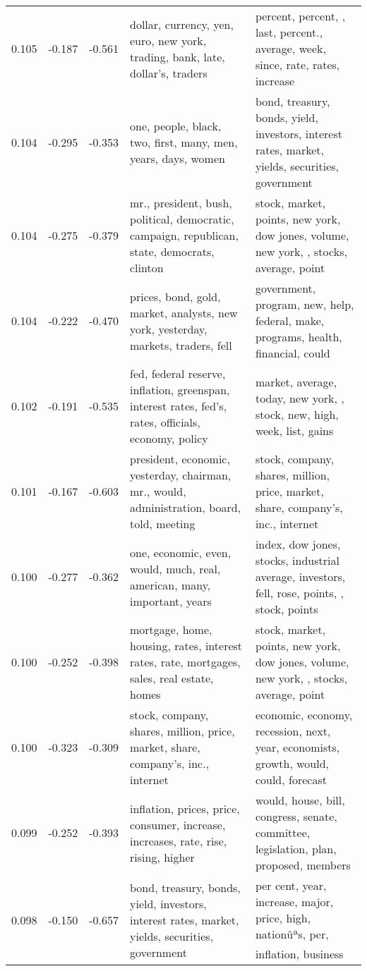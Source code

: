 \begin{tabular}{cccp{5cm}p{5cm}}
0.105 & -0.187 & -0.561 & dollar, currency, yen, euro, new york, trading, bank, late, dollar's, traders & percent, percent, , last, percent., average, week, since, rate, rates, increase \\
0.104 & -0.295 & -0.353 & one, people, black, two, first, many, men, years, days, women & bond, treasury, bonds, yield, investors, interest rates, market, yields, securities, government \\
0.104 & -0.275 & -0.379 & mr., president, bush, political, democratic, campaign, republican, state, democrats, clinton & stock, market, points, new york, dow jones, volume, new york, , stocks, average, point \\
0.104 & -0.222 & -0.470 & prices, bond, gold, market, analysts, new york, yesterday, markets, traders, fell & government, program, new, help, federal, make, programs, health, financial, could \\
0.102 & -0.191 & -0.535 & fed, federal reserve, inflation, greenspan, interest rates, fed's, rates, officials, economy, policy & market, average, today, new york, , stock, new, high, week, list, gains \\
0.101 & -0.167 & -0.603 & president, economic, yesterday, chairman, mr., would, administration, board, told, meeting & stock, company, shares, million, price, market, share, company's, inc., internet \\
0.100 & -0.277 & -0.362 & one, economic, even, would, much, real, american, many, important, years & index, dow jones, stocks, industrial average, investors, fell, rose, points, , stock, points \\
0.100 & -0.252 & -0.398 & mortgage, home, housing, rates, interest rates, rate, mortgages, sales, real estate, homes & stock, market, points, new york, dow jones, volume, new york, , stocks, average, point \\
0.100 & -0.323 & -0.309 & stock, company, shares, million, price, market, share, company's, inc., internet & economic, economy, recession, next, year, economists, growth, would, could, forecast \\
0.099 & -0.252 & -0.393 & inflation, prices, price, consumer, increase, increases, rate, rise, rising, higher & would, house, bill, congress, senate, committee, legislation, plan, proposed, members \\
0.098 & -0.150 & -0.657 & bond, treasury, bonds, yield, investors, interest rates, market, yields, securities, government & per cent, year, increase, major, price, high, nationûªs, per, inflation, business \\

\end{tabular}
